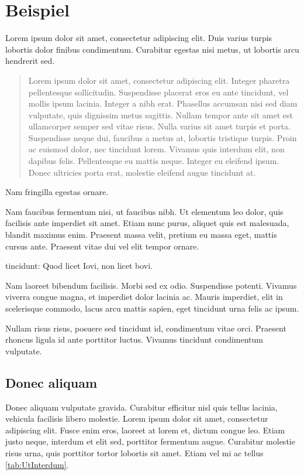 \chapter{Beispiel} \label{ch:Beispiel}
Lorem ipsum dolor sit amet, consectetur adipiscing elit. Duis varius turpis lobortis dolor finibus condimentum. Curabitur egestas nisi metus, ut lobortis arcu hendrerit sed. 
\begin{quote}Lorem ipsum dolor sit amet, consectetur adipiscing elit. Integer pharetra pellentesque sollicitudin. Suspendisse placerat eros eu ante tincidunt, vel mollis ipsum lacinia. Integer a nibh erat. Phasellus accumsan nisi sed diam vulputate, quis dignissim metus sagittis. Nullam tempor ante sit amet est ullamcorper semper sed vitae risus. Nulla varius sit amet turpis et porta. Suspendisse neque dui, faucibus a metus at, lobortis tristique turpis. Proin ac euismod dolor, nec tincidunt lorem. Vivamus quis interdum elit, non dapibus felis. Pellentesque eu mattis neque. Integer eu eleifend ipsum. Donec ultricies porta erat, molestie eleifend augue tincidunt at.\end{quote}
Nam fringilla egestas ornare. 

Nam faucibus fermentum nisi, ut faucibus nibh. Ut elementum leo dolor, quis facilisis ante imperdiet sit amet. Etiam nunc purus, aliquet quis est malesuada, blandit maximus enim. Praesent massa velit, pretium eu massa eget, mattis cursus ante. Praesent vitae dui vel elit tempor ornare. 
\begin{kischt}{tincidunt:}
Quod licet Iovi, non licet bovi.

Nam laoreet bibendum facilisis. Morbi sed ex odio. Suspendisse potenti. Vivamus viverra congue magna, et imperdiet dolor lacinia ac. Mauris imperdiet, elit in scelerisque commodo, lacus arcu mattis sapien, eget tincidunt urna felis ac ipsum.
\end{kischt}
Nullam risus risus, posuere sed tincidunt id, condimentum vitae orci. Praesent rhoncus ligula id ante porttitor luctus. Vivamus tincidunt condimentum vulputate. 

\section{Donec aliquam} \label{sec:DonecAliquam}
 Donec aliquam vulputate gravida. Curabitur efficitur nisl quis tellus lacinia, vehicula facilisis libero molestie. Lorem ipsum dolor sit amet, consectetur adipiscing elit. Fusce enim eros, laoreet at lorem et, dictum congue leo. Etiam justo neque, interdum et elit sed, porttitor fermentum augue. Curabitur molestie risus urna, quis porttitor tortor lobortis sit amet. Etiam vel mi ac tellus \ref{tab:UtInterdum}.
 
